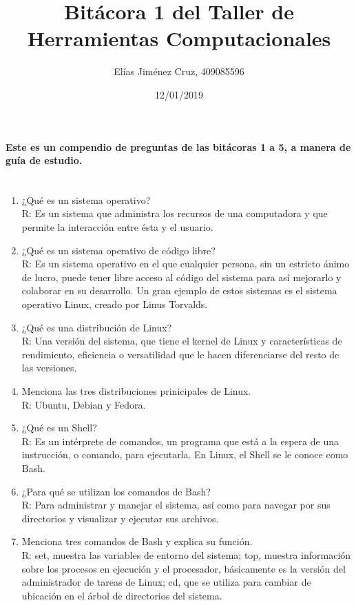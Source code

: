 \documentclass[letterpaper, 12pt, oneside]{article} %
\title{\Huge Bitácora 1 del Taller de Herramientas Computacionales}
\author{Elías Jiménez Cruz, 409085596}
\date{12/01/2019}
\begin{document}
	\maketitle
	\paragraph{Este es un compendio de preguntas de las bitácoras 1 a 5, a manera de guía de estudio.\\\\}
	\begin{enumerate}
		\item ¿Qué es un sistema operativo?\\R: Es un sistema que administra los recursos de una computadora y que permite la interacción entre ésta y el usuario.\\
		\item ¿Qué es un sistema operativo de código libre?\\R: Es un sistema operativo en el que cualquier persona, sin un estricto ánimo de lucro, puede tener libre acceso al código del sistema para así mejorarlo y colaborar en su desarrollo. Un gran ejemplo de estos sistemas es el sistema operativo Linux, creado por Linus Torvalds.\\
		\item ¿Qué es una distribución de Linux?\\R: Una versión del sistema, que tiene el kernel de Linux y características de rendimiento, eficiencia o versatilidad que le hacen diferenciarse del resto de las versiones.\\
		\item Menciona las tres distribuciones prinicipales de Linux.\\R: Ubuntu, Debian y Fedora.\\
		\item ¿Qué es un Shell?\\R: Es un intérprete de comandos, un programa que está a la espera de una instrucción, o comando, para ejecutarla. En Linux, el Shell se le conoce como Bash.\\
		\item ¿Para qué se utilizan los comandos de Bash?\\R: Para administrar y manejar el sistema, así como para navegar por sus directorios y visualizar y ejecutar sus archivos.\\
		\item Menciona tres comandos de Bash y explica su función.\\R: set, muestra las variables de entorno del sistema; top, muestra información sobre los procesos en ejecución y el procesador, básicamente es la versión del administrador de tareas de Linux; cd, que se utiliza para cambiar de ubicación en el árbol de directorios del sistema.\\

\end{enumerate}
\end{document}

